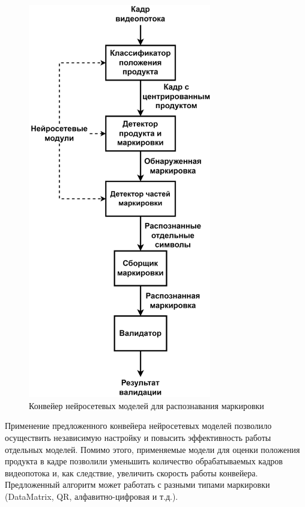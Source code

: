 \documentclass{thesisby}
\begin{document}
\begin{figure}[!ht]
	\centering
	\includegraphics[width=8cm]{man-source/images/ch4/savushkin_structure.png}
	\caption{Конвейер нейросетевых моделей для распознавания маркировки}
	\label{fig:general_diagram}
\end{figure}

Применение предложенного конвейера нейросетевых моделей позволило осуществить независимую настройку и повысить эффективность работы отдельных моделей. Помимо этого, применяемые модели для оценки положения продукта в кадре позволили уменьшить количество обрабатываемых кадров видеопотока и, как следствие, увеличить скорость работы конвейера. Предложенный алгоритм может работать с разными типами маркировки (DataMatrix, QR, алфавитно-цифровая и т.д.).

\end{document}
